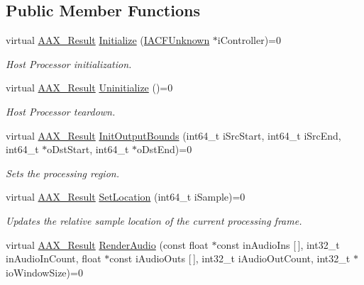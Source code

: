 \subsection*{Public Member Functions}
\begin{DoxyCompactItemize}
\item 
virtual \mbox{\hyperlink{a00392_a4d8f69a697df7f70c3a8e9b8ee130d2f}{A\+A\+X\+\_\+\+Result}} \mbox{\hyperlink{a01693_a00aa7da380e86cd79c6b8da1aa51c3b7}{Initialize}} (\mbox{\hyperlink{a01409}{I\+A\+C\+F\+Unknown}} $\ast$i\+Controller)=0
\begin{DoxyCompactList}\small\item\em Host Processor initialization. \end{DoxyCompactList}\item 
virtual \mbox{\hyperlink{a00392_a4d8f69a697df7f70c3a8e9b8ee130d2f}{A\+A\+X\+\_\+\+Result}} \mbox{\hyperlink{a01693_a238fc3fee9180cd52df2c87180f4a656}{Uninitialize}} ()=0
\begin{DoxyCompactList}\small\item\em Host Processor teardown. \end{DoxyCompactList}\item 
virtual \mbox{\hyperlink{a00392_a4d8f69a697df7f70c3a8e9b8ee130d2f}{A\+A\+X\+\_\+\+Result}} \mbox{\hyperlink{a01693_a157bab3b949dc98f02e66c907c419bad}{Init\+Output\+Bounds}} (int64\+\_\+t i\+Src\+Start, int64\+\_\+t i\+Src\+End, int64\+\_\+t $\ast$o\+Dst\+Start, int64\+\_\+t $\ast$o\+Dst\+End)=0
\begin{DoxyCompactList}\small\item\em Sets the processing region. \end{DoxyCompactList}\item 
virtual \mbox{\hyperlink{a00392_a4d8f69a697df7f70c3a8e9b8ee130d2f}{A\+A\+X\+\_\+\+Result}} \mbox{\hyperlink{a01693_ae9bd1a23f31701d3de6d9d410c819c81}{Set\+Location}} (int64\+\_\+t i\+Sample)=0
\begin{DoxyCompactList}\small\item\em Updates the relative sample location of the current processing frame. \end{DoxyCompactList}\item 
virtual \mbox{\hyperlink{a00392_a4d8f69a697df7f70c3a8e9b8ee130d2f}{A\+A\+X\+\_\+\+Result}} \mbox{\hyperlink{a01693_a29f1352c77cdcce8dbac4d32f1a88887}{Render\+Audio}} (const float $\ast$const in\+Audio\+Ins \mbox{[}$\,$\mbox{]}, int32\+\_\+t in\+Audio\+In\+Count, float $\ast$const i\+Audio\+Outs \mbox{[}$\,$\mbox{]}, int32\+\_\+t i\+Audio\+Out\+Count, int32\+\_\+t $\ast$io\+Window\+Size)=0

\end{DoxyCompactItemize}
